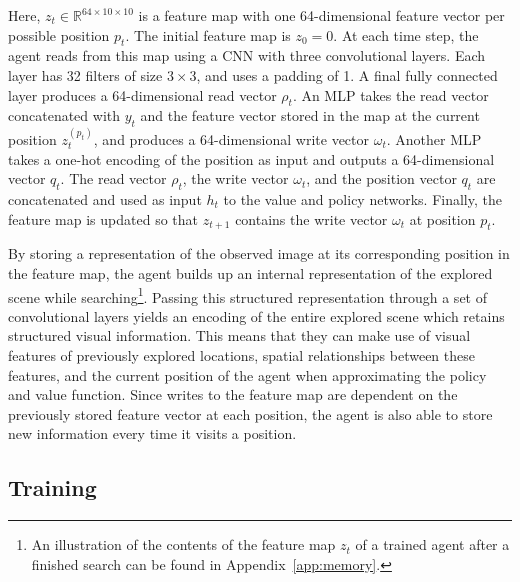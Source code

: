 Here, \(z_t \in \mathbb{R}^{64 \times 10 \times 10}\) is a feature map with one 64-dimensional feature vector per possible position \(p_t\).
The initial feature map is \(z_0 = 0\).
At each time step, the agent reads from this map using a CNN with three convolutional layers.
Each layer has 32 filters of size \(3 \times 3\), and uses a padding of 1.
A final fully connected layer produces a 64-dimensional read vector \(\rho_t\).
An MLP takes the read vector concatenated with \(y_t\) and the feature vector stored in the map at the current position \(z_t^{(p_t)}\), and produces a 64-dimensional write vector \(\omega_{t}\).
Another MLP takes a one-hot encoding of the position as input and outputs a 64-dimensional vector \(q_t\).
The read vector \(\rho_t\), the write vector \(\omega_{t}\), and the position vector \(q_t\) are concatenated and used as input \(h_t\) to the value and policy networks.
Finally, the feature map is updated so that \(z_{t+1}\) contains the write vector \(\omega_{t}\) at position \(p_t\).

By storing a representation of the observed image at its corresponding position in the feature map, the agent builds up an internal representation of the explored scene while searching\footnote{An illustration of the contents of the feature map \(z_t\) of a trained agent after a finished search can be found in Appendix~\ref{app:memory}.}.
Passing this structured representation through a set of convolutional layers yields an encoding of the entire explored scene which retains structured visual information.
This means that they can make use of visual features of previously explored locations, spatial relationships between these features, and the current position of the agent when approximating the policy and value function.
Since writes to the feature map are dependent on the previously stored feature vector at each position, the agent is also able to store new information every time it visits a position.


\subsection{Training}

